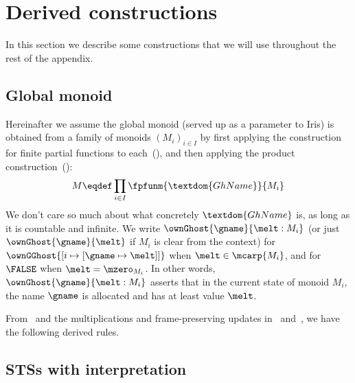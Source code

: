 \section{Derived constructions}

In this section we describe some constructions that we will use throughout the rest of the appendix.

\subsection{Global monoid}

Hereinafter we assume the global monoid (served up as a parameter to Iris) is obtained from a family of monoids $(M_i)_{i \in I}$ by first applying the construction for finite partial functions to each~(), and then applying the product construction~():
\[ M \eqdef \prod_{i \in I} \fpfunm{\textdom{GhName}}{M_i} \]
We don't care so much about what concretely $\textdom{GhName}$ is, as long as it is countable and infinite.
We write $\ownGhost{\gname}{\melt : M_i}$ (or just $\ownGhost{\gname}{\melt}$ if $M_i$ is clear from the context) for $\ownGGhost{[i \mapsto [\gname \mapsto \melt]]}$ when $\melt \in \mcarp {M_i}$, and for $\FALSE$ when $\melt = \mzero_{M_i}$.
In other words, $\ownGhost{\gname}{\melt : M_i}$ asserts that in the current state of monoid $M_i$, the name $\gname$ is allocated and has at least value $\melt$.

From~ and the multiplications and frame-preserving updates in~ and~, we have the following derived rules.

\subsection{STSs with interpretation}\label{sec:stsinterp}

